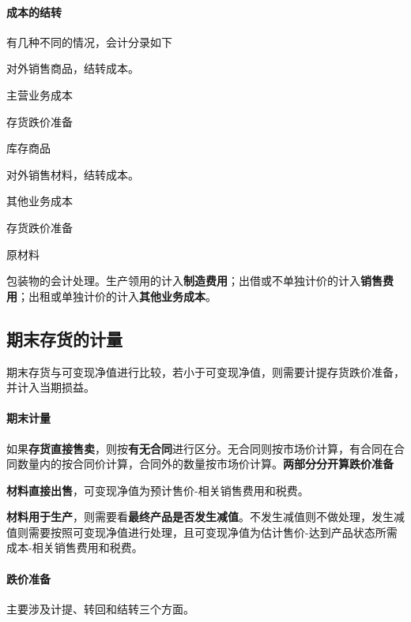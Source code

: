 \documentclass[UTF8,12pt]{ctexart}
\newenvironment{Dr}{%
	\begin{list}{}%
		{
			\setlength{\leftmargin}{2em}
			\setlength{\labelwidth}{2em}
			\setlength{\labelsep}{0pt}
			\setlength{\itemindent}{0pt}
			\setlength{\listparindent}{0pt}
			\setlength{\parsep}{0pt}
			\setlength{\topsep}{0pt}
		}
		\item[\textbf{借：}]
	}{%
	\end{list}
}
\newenvironment{Cr}{%
	\begin{list}{}%
		{
			\setlength{\leftmargin}{2em}
			\setlength{\labelwidth}{2em}
			\setlength{\labelsep}{0pt}
			\setlength{\itemindent}{0pt}
			\setlength{\listparindent}{0pt}
			\setlength{\parsep}{0pt}
			\setlength{\topsep}{0pt}
		}
		\item[\textbf{贷：}]
	}{%
	\end{list}
}
\numberwithin{equation}{section} %
\numberwithin{figure}{section}
\numberwithin{table}{section}
\begin{document}
	\paragraph{成本的结转} 有几种不同的情况，会计分录如下
	\begin{enumerate}
		\item 对外销售商品，结转成本。
		
		\begin{Dr}
			主营业务成本
			
			存货跌价准备
		\end{Dr}
		\begin{Cr}
			库存商品
		\end{Cr}
		
		\item 对外销售材料，结转成本。
		
		\begin{Dr}
			其他业务成本
			
			存货跌价准备
		\end{Dr}
		\begin{Cr}
			原材料
		\end{Cr}
		
		\item 包装物的会计处理。生产领用的计入\textbf{制造费用}；出借或不单独计价的计入\textbf{销售费用}；出租或单独计价的计入\textbf{其他业务成本}。
	\end{enumerate}
	
	\subsection{期末存货的计量}
	期末存货与可变现净值进行比较，若小于可变现净值，则需要计提存货跌价准备，并计入当期损益。
	
	\paragraph{期末计量}
	如果\textbf{存货直接售卖}，则按\textbf{有无合同}进行区分。无合同则按市场价计算，有合同在合同数量内的按合同价计算，合同外的数量按市场价计算。\textbf{两部分分开算跌价准备}
	
	\textbf{材料直接出售}，可变现净值为预计售价-相关销售费用和税费。
	
	\textbf{材料用于生产}，则需要看\textbf{最终产品是否发生减值}。不发生减值则不做处理，发生减值则需要按照可变现净值进行处理，且可变现净值为估计售价-达到产品状态所需成本-相关销售费用和税费。
	
	\paragraph{跌价准备} 主要涉及计提、转回和结转三个方面。
	
\end{document}
